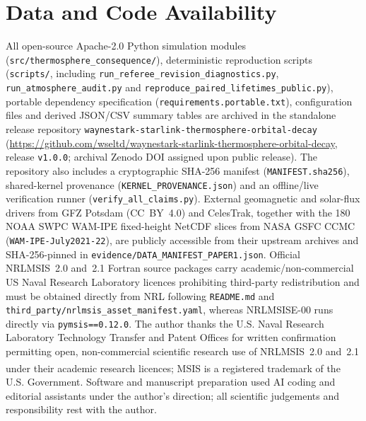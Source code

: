 \documentclass[12pt]{article}
\begin{document}
\section{Data and Code Availability}
\label{sec:availability}

\begin{sloppypar}All open-source Apache-2.0 Python simulation modules (\nolinkurl{src/thermosphere_consequence/}), deterministic reproduction scripts (\texttt{scripts/}, including \nolinkurl{run_referee_revision_diagnostics.py}, \nolinkurl{run_atmosphere_audit.py} and \nolinkurl{reproduce_paired_lifetimes_public.py}), portable dependency specification (\texttt{requirements.portable.txt}), configuration files and derived JSON/CSV summary tables are archived in the standalone release repository \nolinkurl{waynestark-starlink-thermosphere-orbital-decay} (\url{https://github.com/wseltd/waynestark-starlink-thermosphere-orbital-decay}, release \texttt{v1.0.0}; archival Zenodo DOI assigned upon public release). The repository also includes a cryptographic SHA-256 manifest (\texttt{MANIFEST.sha256}), shared-kernel provenance (\nolinkurl{KERNEL_PROVENANCE.json}) and an offline/live verification runner (\nolinkurl{verify_all_claims.py}). External geomagnetic and solar-flux drivers from GFZ Potsdam (CC~BY~4.0) and CelesTrak, together with the 180 NOAA SWPC WAM-IPE fixed-height NetCDF slices from NASA GSFC CCMC (\texttt{WAM-IPE-July2021-22}), are publicly accessible from their upstream archives and SHA-256-pinned in \nolinkurl{evidence/DATA_MANIFEST_PAPER1.json}. Official NRLMSIS~2.0 and~2.1 Fortran source packages carry academic/non-commercial US Naval Research Laboratory licences prohibiting third-party redistribution and must be obtained directly from NRL following \texttt{README.md} and \nolinkurl{third_party/nrlmsis_asset_manifest.yaml}, whereas NRLMSISE-00 runs directly via \texttt{pymsis==0.12.0}. The author thanks the U.S. Naval Research Laboratory Technology Transfer and Patent Offices for written confirmation permitting open, non-commercial scientific research use of NRLMSIS~2.0 and~2.1 under their academic research licences; MSIS\textsuperscript{\textregistered} is a registered trademark of the U.S. Government. Software and manuscript preparation used AI coding and editorial assistants under the author's direction; all scientific judgements and responsibility rest with the author.\end{sloppypar}
\end{document}
